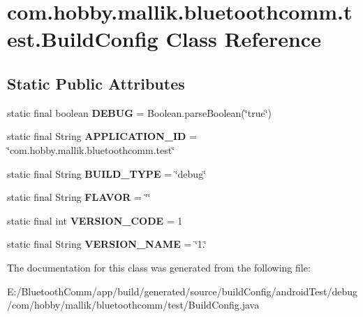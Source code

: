 \hypertarget{classcom_1_1hobby_1_1mallik_1_1bluetoothcomm_1_1test_1_1_build_config}{}\section{com.\+hobby.\+mallik.\+bluetoothcomm.\+test.\+Build\+Config Class Reference}
\label{classcom_1_1hobby_1_1mallik_1_1bluetoothcomm_1_1test_1_1_build_config}
\subsection*{Static Public Attributes}
\begin{DoxyCompactItemize}
\item 
\mbox{\label{classcom_1_1hobby_1_1mallik_1_1bluetoothcomm_1_1test_1_1_build_config_afb6c668d2be19d6a984fc68f821d1bd7}} 
static final boolean {\bfseries D\+E\+B\+UG} = Boolean.\+parse\+Boolean(\char`\"{}true\char`\"{})
\item 
\mbox{\label{classcom_1_1hobby_1_1mallik_1_1bluetoothcomm_1_1test_1_1_build_config_a3506c77376021ca23f4a7bd33708e76d}} 
static final String {\bfseries A\+P\+P\+L\+I\+C\+A\+T\+I\+O\+N\+\_\+\+ID} = \char`\"{}com.\+hobby.\+mallik.\+bluetoothcomm.\+test\char`\"{}
\item 
\mbox{\label{classcom_1_1hobby_1_1mallik_1_1bluetoothcomm_1_1test_1_1_build_config_a3fb6f5c3c60355e7f5bd646ce0dec93c}} 
static final String {\bfseries B\+U\+I\+L\+D\+\_\+\+T\+Y\+PE} = \char`\"{}debug\char`\"{}
\item 
\mbox{\label{classcom_1_1hobby_1_1mallik_1_1bluetoothcomm_1_1test_1_1_build_config_a0644fba6aceab2e7b080b27c87f20c1a}} 
static final String {\bfseries F\+L\+A\+V\+OR} = \char`\"{}\char`\"{}
\item 
\mbox{\label{classcom_1_1hobby_1_1mallik_1_1bluetoothcomm_1_1test_1_1_build_config_aa5583a0e948f136f8423c1ae165d43c5}} 
static final int {\bfseries V\+E\+R\+S\+I\+O\+N\+\_\+\+C\+O\+DE} = 1
\item 
\mbox{\label{classcom_1_1hobby_1_1mallik_1_1bluetoothcomm_1_1test_1_1_build_config_a066da96795b651efe22d994fa9acfabd}} 
static final String {\bfseries V\+E\+R\+S\+I\+O\+N\+\_\+\+N\+A\+ME} = \char`\"{}1.\char`\"{}
\end{DoxyCompactItemize}


The documentation for this class was generated from the following file\+:\begin{DoxyCompactItemize}
\item 
E\+:/\+Bluetooth\+Comm/app/build/generated/source/build\+Config/android\+Test/debug/com/hobby/mallik/bluetoothcomm/test/Build\+Config.\+java\end{DoxyCompactItemize}

